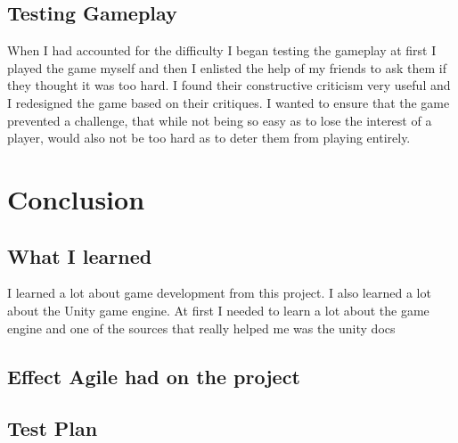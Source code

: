 \documentclass{report}
\begin{document}
\section{Testing Gameplay}
When I had accounted for the difficulty I began testing the gameplay at first I played the game myself and then I enlisted the help of my friends to ask them if they thought it was too hard.  I found their constructive criticism very useful and I redesigned the game based on their critiques.  I wanted to ensure that the game prevented a challenge, that while not being so easy as to lose the interest of a player, would also not be too hard as to deter them from playing entirely. 
\chapter{Conclusion}
\section{What I learned}
I learned a lot about game development from this project.  I also learned a lot about the Unity game engine.  At first I needed to learn a lot about the game engine and one of the sources that really helped me was the unity docs \cite{UnityDocs}
\section{Effect Agile had on the project}
\section{Test Plan}


\end{document}
